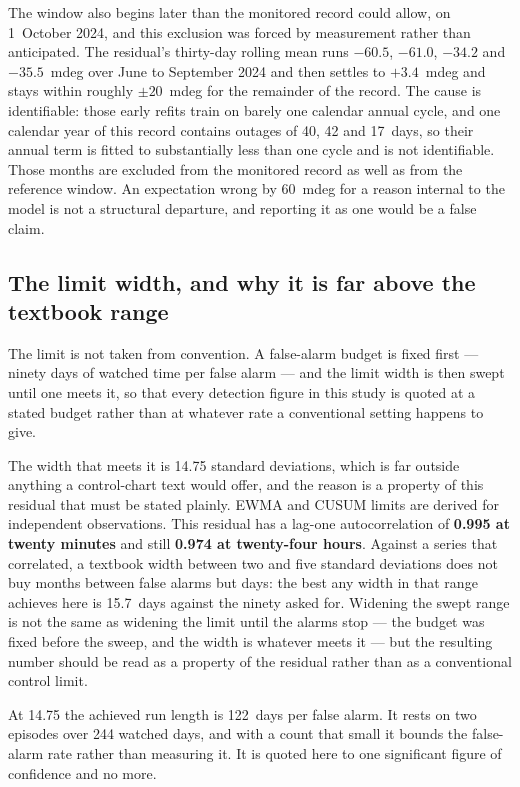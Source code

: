 \documentclass[11pt,a4paper]{article}
\begin{document}
The window also begins later than the monitored record could allow, on
1~October 2024, and this exclusion was forced by measurement rather than
anticipated. The residual's thirty-day rolling mean runs $-60.5$, $-61.0$,
$-34.2$ and $-35.5$~mdeg over June to September 2024 and then settles to
$+3.4$~mdeg and stays within roughly $\pm20$~mdeg for the remainder of the
record. The cause is identifiable: those early refits train on barely one
calendar annual cycle, and one calendar year of this record contains outages of
40, 42 and 17~days, so their annual term is fitted to substantially less than one
cycle and is not identifiable. Those months are excluded from the monitored
record as well as from the reference window. An expectation wrong by 60~mdeg for
a reason internal to the model is not a structural departure, and reporting it as
one would be a false claim.

\subsection{The limit width, and why it is far above the textbook range}

The limit is not taken from convention. A false-alarm budget is fixed first ---
ninety days of watched time per false alarm --- and the limit width is then swept
until one meets it, so that every detection figure in this study is quoted at a
stated budget rather than at whatever rate a conventional setting happens to
give.

The width that meets it is 14.75 standard deviations, which is far outside
anything a control-chart text would offer, and the reason is a property of this
residual that must be stated plainly. EWMA and CUSUM limits are derived for
independent observations. This residual has a lag-one autocorrelation of
\textbf{0.995 at twenty minutes} and still \textbf{0.974 at twenty-four hours}.
Against a series that correlated, a textbook width between two and five standard
deviations does not buy months between false alarms but days: the best any width
in that range achieves here is 15.7~days against the ninety asked for. Widening
the swept range is not the same as widening the limit until the alarms stop ---
the budget was fixed before the sweep, and the width is whatever meets it --- but
the resulting number should be read as a property of the residual rather than as
a conventional control limit.

At 14.75 the achieved run length is 122~days per false alarm. It rests on two
episodes over 244 watched days, and with a count that small it bounds the
false-alarm rate rather than measuring it. It is quoted here to one significant
figure of confidence and no more.
\end{document}

